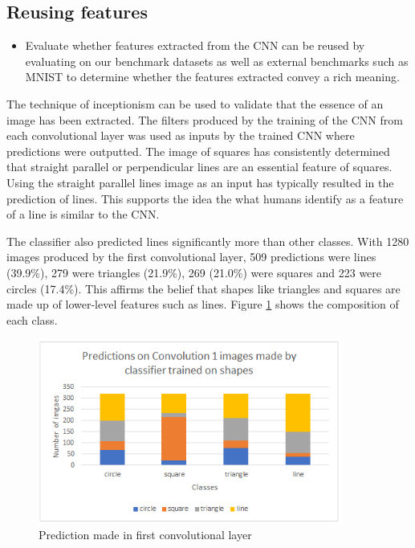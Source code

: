 \subsection{Reusing features} \label{subsec:reuse}
\begin{itemize}
		\item Evaluate whether features extracted from the CNN can be reused by evaluating on our benchmark datasets as well as external benchmarks such as MNIST to determine whether the features extracted convey a rich meaning.
	
\end{itemize}

The technique of inceptionism can be used to validate that the essence of an image has been extracted. The filters produced by the training of the CNN from each convolutional layer was used as inputs by the trained CNN where predictions were outputted. The image of squares has consistently determined that straight parallel or perpendicular lines are an essential feature of squares. Using the straight parallel lines image as an input has typically resulted in the prediction of lines. This supports the idea the what humans identify as a feature of a line is similar to the CNN.  

The classifier also predicted lines significantly more than other classes. With 1280 images produced by the first convolutional layer, 509 predictions were lines (39.9\%), 279 were triangles (21.9\%), 269 (21.0\%) were squares and 223 were circles (17.4\%). This affirms the belief that shapes like triangles and squares are made up of lower-level features such as lines. Figure \ref{fig:graph_conv1} shows the composition of each class. 
\begin{figure}
	\begin{center}
		\includegraphics[width=100mm, scale=1]{graph_conv1.png}
		\caption{Prediction made in first convolutional layer}
		\label{fig:graph_conv1}
	\end{center}
	
\end{figure}

